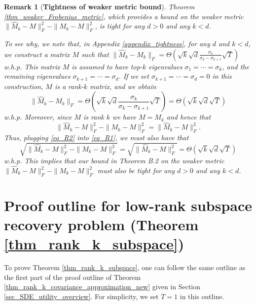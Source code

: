 \documentclass[11pt,letterpaper]{article}
\newtheorem{remark}[theorem]{Remark}
\begin{document}
 \begin{remark}[\bf Tightness of weaker metric bound]\label{remark_tightness_weaker_metric}
Theorem \ref{thm_weaker_Frobenius_metric}, which provides a bound on the weaker metric $\| \hat{M}_k - M \|_F^2 - \|  M_k - M \|_F^2$, is tight for any $d > 0$ and any $k<d$.

To see why, we note that, in Appendix \ref{appendix_tightness}, for any $d$ and  $k<d$, we construct a matrix $M$ such that $\|\hat{M}_k - M_k\|_F = \Theta(\sqrt{k} \sqrt{d} \frac{\sigma_k}{\sigma_k- \sigma_{k+1}} \sqrt{T})$ w.h.p.
%
This matrix $M$ is assumed to have top-$k$ eigenvalues $\sigma_1 = \cdots = \sigma_k$, and the remaining eigenvalues $\sigma_{k+1}= \cdots = \sigma_d$.
%
If we set $\sigma_{k+1}= \cdots = \sigma_d = 0$ in this construction, $M$  is a rank-$k$ matrix, and we obtain 
%
%
\begin{equation}\label{eq_R1}
\|\hat{M}_k - M_k\|_F = \Theta\left(\sqrt{k} \sqrt{d} \frac{\sigma_k}{\sigma_k- \sigma_{k+1}} \sqrt{T}\right) =  \Theta(\sqrt{k} \sqrt{d} \sqrt{T})
\end{equation}
 w.h.p.
 Moreover, since $M$ is rank $k$ we have $M = M_k$ and hence that
\begin{equation}\label{eq_R2}
\| \hat{M}_k - M \|_F^2 - \|  M_k - M \|_F^2 = \|\hat{M}_k - M\|_F^2.
\end{equation}
%
Thus, plugging \eqref{eq_R2} into \eqref{eq_R1}, we must also have that
%
$$\sqrt{\| \hat{M}_k - M \|_F^2 - \|  M_k - M \|_F^2} = \sqrt{\|\hat{M}_k - M\|_F^2} =  \Theta(\sqrt{k} \sqrt{d} \sqrt{T})$$
w.h.p.
%
This implies that our bound in Theorem B.2 on the weaker metric $\| \hat{M}_k - M \|_F^2 - \|  M_k - M \|_F^2$ must also be tight for any $d>0$ and any $k<d$.
\end{remark}
\color{black}





\section{Proof outline for low-rank subspace recovery problem (Theorem \ref{thm_rank_k_subspace})}\label{Subpsace_recovery_outline}

To prove Theorem \ref{thm_rank_k_subspace}, one can follow the same outline as the first part of the proof outline of Theorem \ref{thm_rank_k_covariance_approximation_new} given in Section \ref{sec_SDE_utility_overview}.
%
For simplicity, we set $T=1$ in this outline.
\end{document}
